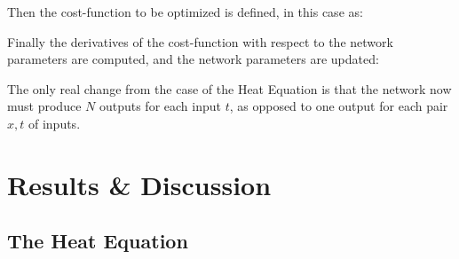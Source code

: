 \documentclass[reprint, english, nofootinbib]{revtex4-2}
\begin{document}

Then the cost-function to be optimized is defined, in this case as:


Finally the derivatives of the cost-function with respect to the network parameters are computed, and the network parameters are updated:


The only real change from the case of the Heat Equation is that the network now must produce $N$ outputs for each input $t$, as opposed to one output for each pair $x,t$ of inputs.


\section{Results \& Discussion}

\subsection{The Heat Equation}
\end{document}
